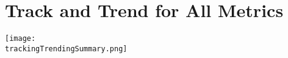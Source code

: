 % 
% 
% 
%
%

\section{Track and Trend for All Metrics}

\ifdefined \trackingTrendingSummary

\begin{center}
  \texttt{[image: \\trackingTrendingSummary.png]}
\end{center}

